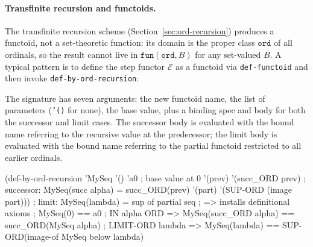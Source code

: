 \paragraph{Transfinite recursion and functoids.}
\begin{sloppypar}The transfinite recursion scheme
(Section~\ref{sec:ord-recursion}) produces a functoid, not a
set-theoretic function: its domain is the proper class $\mathtt{ord}$
of all ordinals, so the result cannot live in $\mathtt{fun}(\mathtt{ord}, B)$
for any set-valued $B$.  A typical pattern is to define the step
functor $\mathcal{E}$ as a functoid via \texttt{def-functoid} and
then invoke \texttt{def-by-ord-recursion}:\end{sloppypar}
The signature has seven arguments: the new functoid name, the list of
parameters (\texttt{'()} for none), the base value, plus a binding spec
and body for both the successor and limit cases.  The successor body is evaluated with the bound name
referring to the recursive value at the predecessor; the limit body
is evaluated with the bound name referring to the partial functoid
restricted to all earlier ordinals.
\begin{VNBcode}
(def-by-ord-recursion 'MySeq '()
  'a0                                 ; base value at 0
  '(prev) '(succ_ORD prev)            ; successor: MySeq(succ alpha) = succ_ORD(prev)
  '(part) '(SUP-ORD (image part)))    ; limit:    MySeq(lambda) = sup of partial seq
; => installs definitional axioms
;      MySeq(0) == a0
;      IN alpha ORD => MySeq(succ_ORD alpha) == succ_ORD(MySeq alpha)
;      LIMIT-ORD lambda => MySeq(lambda) == SUP-ORD(image-of MySeq below lambda)
\end{VNBcode}

